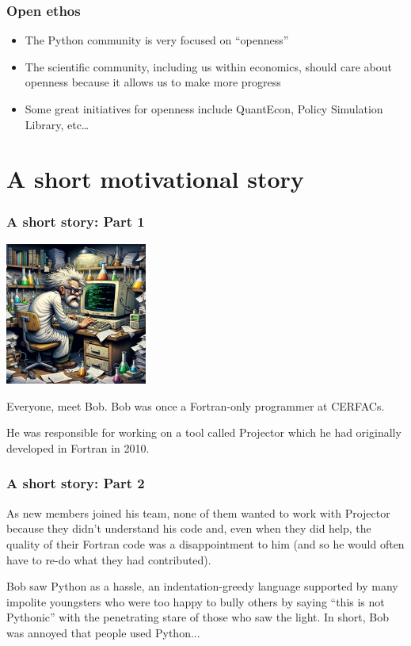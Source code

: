 \documentclass[
    xcolor={svgnames,dvipsnames},
    hyperref={colorlinks, citecolor=DeepPink4, linkcolor=DarkRed, urlcolor=DarkBlue}
]{beamer}  %
\newcommand{\1}{\mathbbm 1}
\begin{document}
\begin{frame}
    \frametitle{Open ethos}

    \begin{itemize}
        \item The Python community is very focused on ``openness''
        \item The scientific community, including us within economics, should care about openness
            because it allows us to make more progress
        \item Some great initiatives for openness include QuantEcon, Policy Simulation Library,
            etc\dots
    \end{itemize}

\end{frame}


\section{A short motivational story}
\begin{frame}
    \frametitle{A short story: Part 1}

    \begin{center}
        \includegraphics[width=0.35\textwidth]{bob.png}
    \end{center}

    Everyone, meet Bob. Bob was once a Fortran-only programmer at CERFACs.

    He was responsible for working on a tool called Projector which he had
    originally developed in Fortran in 2010.

\end{frame}

\begin{frame}
    \frametitle{A short story: Part 2}

    As new members joined his team, none of them wanted to work with Projector because they
    didn't understand his code and, even when they did help, the quality of their Fortran code
    was a disappointment to him (and so he would often have to re-do what they had contributed).

    Bob saw Python as a hassle, an indentation-greedy language supported by many impolite
    youngsters who were too happy to bully others by saying ``this is not Pythonic'' with the
    penetrating stare of those who saw the light. In short, Bob was annoyed that people used
    Python...

\end{frame}
\end{document}
